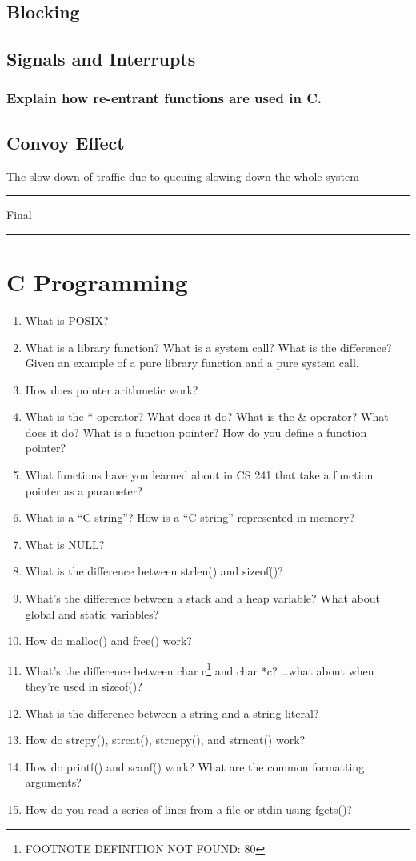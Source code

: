 \documentclass[11pt]{article}
\begin{document}
\subsection{Blocking}
\label{sec-7.5}

\subsection{Signals and Interrupts}
\label{sec-7.6}

\subsubsection{Explain how re-entrant functions are used in C.}
\label{sec-7.6.1}

\subsection{Convoy Effect}
\label{sec-7.7}

   The slow down of traffic due to queuing slowing down the whole system


\hrule
Final
\hrule
\section{C Programming}
\label{sec-8}

\begin{enumerate}
\item What is POSIX?
\item What is a library function? What is a system call? What is the
    difference? Given an example of a pure library function and a pure system call.
\item How does pointer arithmetic work?
\item What is the * operator? What does it do? What is the \& operator?
    What does it do? What is a function pointer? How do you define a function pointer?
\item What functions have you learned about in CS 241 that take a function pointer as a parameter?
\item What is a “C string”? How is a “C string” represented in memory?
\item What is NULL?
\item What is the difference between strlen() and sizeof()?
\item What’s the difference between a stack and a heap variable? What
    about global and static variables?
\item How do malloc() and free() work?
\item What’s the difference between char c\footnote{FOOTNOTE DEFINITION NOT FOUND: 80 } and char *c? \ldots{}what
     about when they’re used in sizeof()?
\item What is the difference between a string and a string
     literal?
\item How do strcpy(), strcat(), strncpy(), and strncat() work?
\item How do printf() and scanf() work? What are the common
     formatting arguments?
\item How do you read a series of lines from a file or stdin using fgets()?
\end{enumerate}
\end{document}
